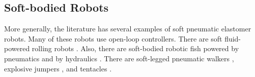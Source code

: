 
\subsection{Soft-bodied Robots}
\label{subsec:Related Work, Soft Robots}
More generally, the literature has several examples of soft pneumatic elastomer robots.
Many of these robots use open-loop controllers.
There are soft fluid-powered rolling robots \citep{correll2010soft, onal2011soft, marchese2011soft}.
Also, there are soft-bodied robotic fish powered by pneumatics \citep{marchese2014autonomous} and by hydraulics \citep{katzschmann2014hydraulic}.
There are soft-legged pneumatic walkers \citep{shepherd2011multigait, tolley2014resilient}, explosive jumpers \citep{shepherd2013using}, and tentacles \citep{martinez2013robotic}.


